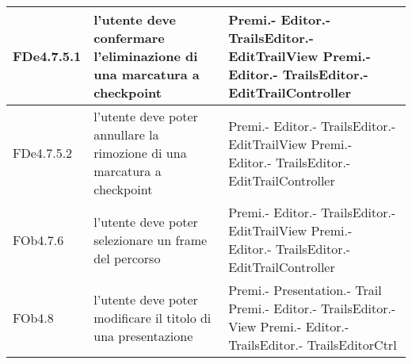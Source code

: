 \begin{longtable}{|l|p{5cm}|p{7cm}|}
\hline
FDe4.7.5.1 & l'utente deve confermare l'eliminazione di una marcatura a checkpoint & Premi.- \linebreak Editor.- \linebreak TrailsEditor.- \linebreak EditTrailView \linebreak Premi.- \linebreak Editor.- \linebreak TrailsEditor.- \linebreak EditTrailController \linebreak \\
\hline
FDe4.7.5.2 & l'utente deve poter annullare la rimozione di una marcatura a checkpoint & Premi.- \linebreak Editor.- \linebreak TrailsEditor.- \linebreak EditTrailView \linebreak Premi.- \linebreak Editor.- \linebreak TrailsEditor.- \linebreak EditTrailController \linebreak \\
\hline
FOb4.7.6 & l'utente deve poter selezionare un frame del percorso & Premi.- \linebreak Editor.- \linebreak TrailsEditor.- \linebreak EditTrailView \linebreak Premi.- \linebreak Editor.- \linebreak TrailsEditor.- \linebreak EditTrailController \linebreak \\
\hline
FOb4.8 & l'utente deve poter modificare il titolo di una presentazione & Premi.- \linebreak Presentation.- \linebreak Trail \linebreak Premi.- \linebreak Editor.- \linebreak TrailsEditor.- \linebreak View \linebreak Premi.- \linebreak Editor.- \linebreak TrailsEditor.- \linebreak TrailsEditorCtrl \linebreak \\

\end{longtable}
